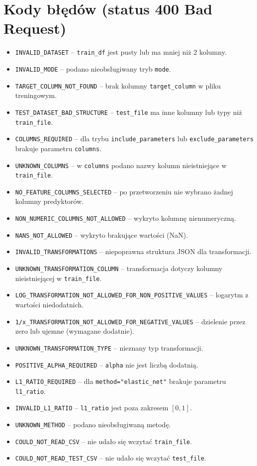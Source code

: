\documentclass[12pt,a4paper]{article}
\begin{document}
\section{Kody błędów (status 400 Bad Request)}
\begin{itemize}
    \item \texttt{INVALID\_DATASET} – \texttt{train\_df} jest pusty lub ma mniej niż 2 kolumny.
    \item \texttt{INVALID\_MODE} – podano nieobsługiwany tryb \texttt{mode}.
    \item \texttt{TARGET\_COLUMN\_NOT\_FOUND} – brak kolumny \texttt{target\_column} w pliku treningowym.
    \item \texttt{TEST\_DATASET\_BAD\_STRUCTURE} – \texttt{test\_file} ma inne kolumny lub typy niż \texttt{train\_file}.
    \item \texttt{COLUMNS\_REQUIRED} – dla trybu \texttt{include\_parameters} lub \texttt{exclude\_parameters} brakuje parametru \texttt{columns}.
    \item \texttt{UNKNOWN\_COLUMNS} – w \texttt{columns} podano nazwy kolumn nieistniejące w \texttt{train\_file}.
    \item \texttt{NO\_FEATURE\_COLUMNS\_SELECTED} – po przetworzeniu nie wybrano żadnej kolumny predyktorów.
    \item \texttt{NON\_NUMERIC\_COLUMNS\_NOT\_ALLOWED} – wykryto kolumnę nienumeryczną.
    \item \texttt{NANS\_NOT\_ALLOWED} – wykryto brakujące wartości (NaN).
    \item \texttt{INVALID\_TRANSFORMATIONS} – niepoprawna struktura JSON dla transformacji.
    \item \texttt{UNKNOWN\_TRANSFORMATION\_COLUMN} – transformacja dotyczy kolumny nieistniejącej w \texttt{train\_file}.
    \item \texttt{LOG\_TRANSFORMATION\_NOT\_ALLOWED\_FOR\_NON\_POSITIVE\_VALUES} – logarytm z wartości niedodatnich.
    \item \texttt{1/x\_TRANSFORMATION\_NOT\_ALLOWED\_FOR\_NEGATIVE\_VALUES} – dzielenie przez zero lub ujemne (wymagane dodatnie).
    \item \texttt{UNKNOWN\_TRANSFORMATION\_TYPE} – nieznany typ transformacji.
    \item \texttt{POSITIVE\_ALPHA\_REQUIRED} – \texttt{alpha} nie jest liczbą dodatnią.
    \item \texttt{L1\_RATIO\_REQUIRED} – dla \texttt{method="elastic\_net"} brakuje parametru \texttt{l1\_ratio}.
    \item \texttt{INVALID\_L1\_RATIO} – \texttt{l1\_ratio} jest poza zakresem \([0, 1]\).
    \item \texttt{UNKNOWN\_METHOD} – podano nieobsługiwaną metodę.
    \item \texttt{COULD\_NOT\_READ\_CSV} – nie udało się wczytać \texttt{train\_file}.
    \item \texttt{COULD\_NOT\_READ\_TEST\_CSV} – nie udało się wczytać \texttt{test\_file}.
\end{itemize}
\end{document}

